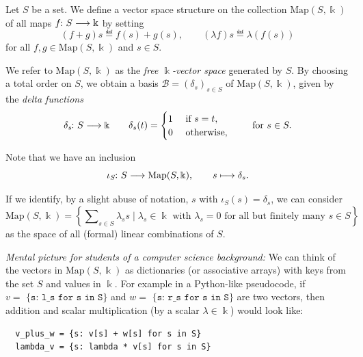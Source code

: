 \documentclass[a4paper, oneside, 12pt]{amsart}
\begin{document}
\begin{example}\label{ex:free-vector-space}
  Let \(S\) be a set.
  We define a vector space structure on the collection \(\mathrm{Map}(S, \Bbbk)\) of all  maps \(f \from S \to \Bbbk  \) by setting
  \begin{equation*}
    (f+g)s \eqdef f(s) + g(s), \qquad (\lambda f) s \eqdef \lambda (f(s))
  \end{equation*}
  for all \(f,g \in \mathrm{Map}(S, \Bbbk)\) and \(s \in S\).

  We refer to \(\mathrm{Map}(S, \Bbbk)\) as the \emph{free \(\Bbbk\)-vector space} generated by \(S\).
  By choosing a total order on \(S\), we obtain a basis \(\mathcal{B}= (\delta_{s})_{s\in S}\) of \(\mathrm{Map}(S, \Bbbk)\), given by the \emph{delta functions}
  \begin{equation}
    \delta_{s} \from S \to \Bbbk\qquad \delta_{s}(t) =
    \begin{cases}
      1 & \text{ if } s= t, \\
      0 & \text{ otherwise},
    \end{cases} \qquad \text{ for } s\in S.
  \end{equation}

  Note that we have an inclusion
  \begin{equation*}
    \iota_{S} \from S \to \mathrm{Map}(S, \Bbbk), \qquad
    s \mapsto \delta_{s}.
  \end{equation*}

  If we identify,  by a slight abuse of notation, \(s\) with \(\iota_{S}(s) = \delta_{s}\), we can consider
  \begin{equation}
    \mathrm{Map}(S, \Bbbk) = \left\{\sum\nolimits_{s\in S} \lambda_{s} s \mid \lambda_{s}\in \Bbbk \text{ with } \lambda_{s}= 0 \text{ for all but finitely many } s\in S\right\}
  \end{equation}
  as the space of all (formal) linear combinations of \(S\).

  \textit{Mental picture for students of a computer science background:}
  We can think of the vectors in \( \mathrm{Map}(S, \Bbbk) \) as dictionaries (or associative arrays) with keys from the set \( S \) and values in \( \Bbbk \).
  For example in a Python-like pseudocode, if \( v= \texttt{ \{s: l\_s for s in S\}} \) and \(w= \texttt{ \{s: r\_s for s in S\}} \) are two vectors, then addition and scalar multiplication (by a scalar \(\lambda \in \Bbbk\))  would look like:
\begin{verbatim}
  v_plus_w = {s: v[s] + w[s] for s in S}
  lambda_v = {s: lambda * v[s] for s in S}
\end{verbatim}
\end{example}
\end{document}
